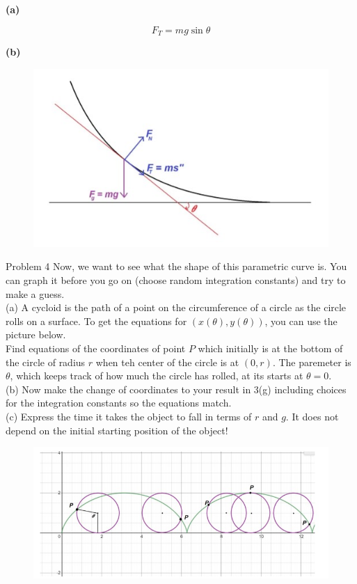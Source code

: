 \documentclass{article}
\begin{document}
    \textbf{(a)}

    \[
        F_T = mg\sin{\theta}
    \]

    \textbf{(b)} \\


    \begin{figure}[hbt!]
        \centering
        \includegraphics[scale=0.75]{Worksheet11_Problem3}
    \end{figure}

    \begin{tbhtheorem}{Problem 4}
        Now, we want to see what the shape of this parametric curve is. You can graph it before you go on (choose random integration constants) and try to make a guess. \\
        (a) A cycloid is the path of a point on the circumference of a circle as the circle rolls on a surface. To get the equations for $\left(x(\theta), y(\theta)\right)$, you can use the picture below. \\
        Find equations of the coordinates of point $P$ which initially is at the bottom of the circle of radius $r$ when teh center of the circle is at $(0,r)$. The paremeter is $\theta$, which keeps track of how much
        the circle has rolled, at its starts at $\theta = 0$. \\
        (b) Now make the change of coordinates to your result in 3(g) including choices for the integration constants so the equations match. \\
        (c) Express the time it takes the object to fall in terms of $r$ and $g$. It does not depend on the initial starting position of the object!
    \end{tbhtheorem}

    \begin{figure}[hbt!]
        \centering
        \includegraphics[scale=0.75]{Worksheet11_Problem4}
    \end{figure}
\end{document}
